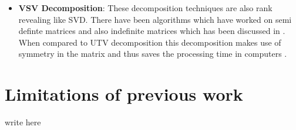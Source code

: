 \begin{itemize}
	\item \textbf{VSV Decomposition}: These decomposition techniques are also rank revealing like SVD. There have been algorithms which have worked on semi definte matrices and also indefinite matrices which has been discussed in \cite{luk1996symmetric}\cite{baker1998correlation}. When compared to UTV decomposition this decomposition makes use of symmetry in the matrix and thus saves the processing time in computers \cite{fierro2005utv}.
\end{itemize}

\section{Limitations of previous work}
\color{red} write here \color{black}

